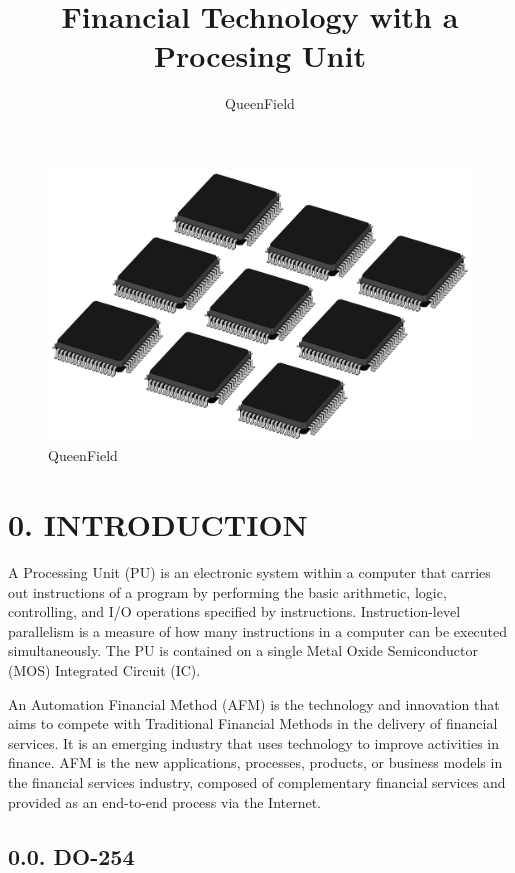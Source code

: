 \documentclass[
]{article}
\title{Financial Technology with a Procesing Unit}
\author{QueenField}
\date{}
\begin{document}
\maketitle

\begin{figure}
\centering
\includegraphics{../icon.jpg}
\caption{QueenField}
\end{figure}

\hypertarget{introduction}{%
\section{0. INTRODUCTION}\label{introduction}}

A Processing Unit (PU) is an electronic system within a computer that
carries out instructions of a program by performing the basic
arithmetic, logic, controlling, and I/O operations specified by
instructions. Instruction-level parallelism is a measure of how many
instructions in a computer can be executed simultaneously. The PU is
contained on a single Metal Oxide Semiconductor (MOS) Integrated Circuit
(IC).

An Automation Financial Method (AFM) is the technology and innovation
that aims to compete with Traditional Financial Methods in the delivery
of financial services. It is an emerging industry that uses technology
to improve activities in finance. AFM is the new applications,
processes, products, or business models in the financial services
industry, composed of complementary financial services and provided as
an end-to-end process via the Internet.

\hypertarget{do-254}{%
\subsection{0.0. DO-254}\label{do-254}}
\end{document}
